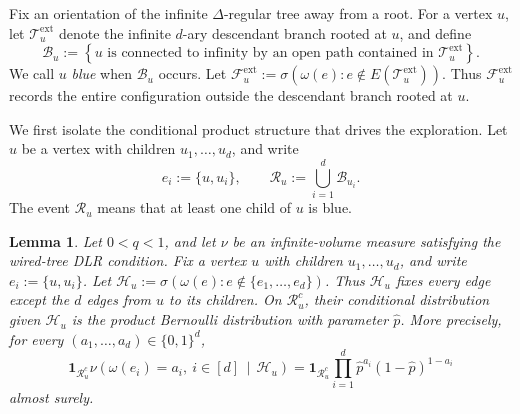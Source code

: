 \documentclass[11pt]{amsart}
\theoremstyle{plain}
\newtheorem{lemma}[theorem]{Lemma}
\theoremstyle{definition}
\theoremstyle{remark}
\begin{document}
Fix an orientation of the infinite $\Delta$-regular tree away from a root. For a vertex $u$, let $\mathcal T_u^{\mathrm{ext}}$ denote the infinite $d$-ary descendant branch rooted at $u$, and define
\[
    \mathcal B_u
    :=
    \left\{
        u\text{ is connected to infinity by an open path contained in }
        \mathcal T_u^{\mathrm{ext}}
    \right\}.
\]
We call $u$ \emph{blue} when $\mathcal B_u$ occurs. Let $\mathcal F_u^{\mathrm{ext}}:=\sigma\left(\omega(e):e\notin E(\mathcal T_u^{\mathrm{ext}})\right)$. Thus $\mathcal F_u^{\mathrm{ext}}$ records the entire configuration outside the descendant branch rooted at $u$.

We first isolate the conditional product structure that drives the exploration. Let $u$ be a vertex with children $u_1,\ldots,u_d$, and write
\[
    e_i:=\{u,u_i\},
    \qquad
    \mathcal R_u
    :=
    \bigcup_{i=1}^d\mathcal B_{u_i}.
\]
The event $\mathcal R_u$ means that at least one child of $u$ is blue.

\begin{lemma}
\label{lem:conditional-star-factorization}
Let $0<q<1$, and let $\nu$ be an infinite-volume measure satisfying the wired-tree DLR condition. Fix a vertex $u$ with children $u_1,\ldots,u_d$, and write $e_i:=\{u,u_i\}$. Let $\mathcal H_u := \sigma\left(\omega(e):e\notin\{e_1,\ldots,e_d\}\right)$. Thus $\mathcal H_u$ fixes every edge except the $d$ edges from $u$ to
its children. On $\mathcal R_u^c$, their conditional distribution given
$\mathcal H_u$ is the product Bernoulli distribution with parameter
$\widehat p$. More precisely, for every
$(a_1,\ldots,a_d)\in\{0,1\}^d$,
\[
    \mathbf 1_{\mathcal R_u^c}
    \nu\left(
        \omega(e_i)=a_i,\ i\in[d]
        \,\middle|\,
        \mathcal H_u
    \right)
    =
    \mathbf 1_{\mathcal R_u^c}
    \prod_{i=1}^d
    \widehat p^{a_i}
    (1-\widehat p)^{1-a_i}
\]
almost surely.
\end{lemma}
\end{document}
